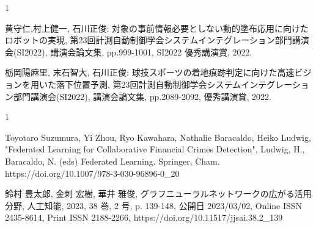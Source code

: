 \begin{受賞}{1}


黄守仁,村上健一, 石川正俊: 対象の事前情報必要としない動的塗布応用に向けたロボットの実現, 第23回計測自動制御学会システムインテグレーション部門講演会(SI2022), 講演会論文集, pp.999-1001, SI2022 優秀講演賞, 2022.


栃岡陽麻里, 末石智大, 石川正俊: 球技スポーツの着地痕跡判定に向けた高速ビジョンを用いた落下位置予測, 第23回計測自動制御学会システムインテグレーション部門講演会(SI2022), 講演会論文集, pp.2089-2092, 優秀講演賞, 2022.




\end{受賞}

\begin{著書}{1}






Toyotaro Suzumura, Yi Zhou, Ryo Kawahara, Nathalie Baracaldo, Heiko Ludwig,
"Federated Learning for Collaborative Financial Crimes Detection",
Ludwig, H., Baracaldo, N. (eds) Federated Learning. Springer, Cham. https://doi.org/10.1007/978-3-030-96896-0\_20

鈴村 豊太郎, 金刺 宏樹, 華井 雅俊, グラフニューラルネットワークの広がる活用分野, 人工知能, 2023, 38 巻, 2 号, p. 139-148, 公開日 2023/03/02, Online ISSN 2435-8614, Print ISSN 2188-2266, https://doi.org/10.11517/jjsai.38.2\_139

\end{著書}

